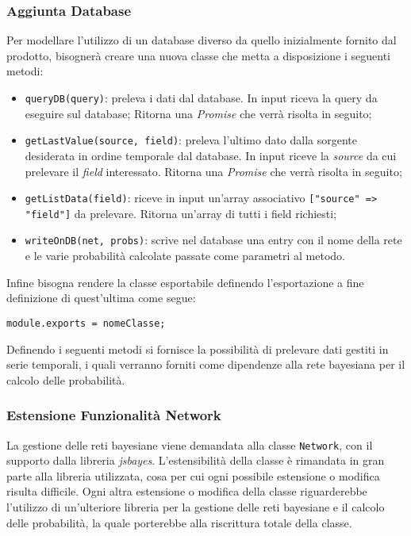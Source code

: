 \subsubsection{Aggiunta Database}\label{ExtAddDB}
Per modellare l'utilizzo di un database diverso da quello inizialmente fornito dal prodotto, bisognerà creare una nuova classe che metta a disposizione i seguenti metodi: 
\begin{itemize}
 \item \texttt{queryDB(query)}: preleva i dati dal database. In input riceva la query da eseguire sul database;
 Ritorna una \textit{Promise} che verrà risolta in seguito;
 \item \texttt{getLastValue(source, field)}: preleva l'ultimo dato dalla sorgente desiderata in ordine temporale dal database. In input riceve la \textit{source} da cui prelevare il \textit{field} interessato. Ritorna una \textit{Promise} che verrà risolta in seguito;
 \item \texttt{getListData(field)}: riceve in input un'array associativo \texttt{["source" => "field"]} da prelevare. 
 Ritorna un'array di tutti i field richiesti;
 \item \texttt{writeOnDB(net, probs)}: scrive nel database una entry con il nome della rete e le varie probabilità calcolate passate come parametri al metodo.
\end{itemize}
Infine bisogna rendere la classe esportabile definendo l'esportazione a fine definizione di quest'ultima come segue: 
\begin{center}
 \texttt{module.exports = nomeClasse;}
\end{center}
Definendo i seguenti metodi si fornisce la possibilità di prelevare dati gestiti in serie temporali, i quali verranno forniti come dipendenze alla rete bayesiana per il calcolo delle probabilità. 

\subsubsection{Estensione Funzionalità Network}
La gestione delle reti bayesiane viene  demandata alla classe \texttt{Network}, con il supporto dalla libreria \textit{jsbayes}. L'estensibilità della classe è rimandata in gran parte alla libreria utilizzata, cosa per cui ogni possibile estensione o modifica risulta difficile. Ogni altra estensione o modifica della classe riguarderebbe l'utilizzo di un'ulteriore libreria per la gestione delle reti bayesiane e il calcolo delle probabilità, la quale porterebbe alla riscrittura totale della classe. 


